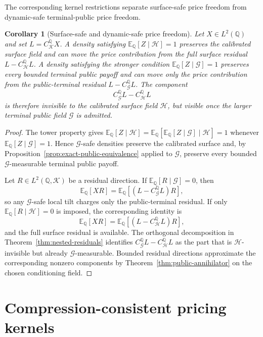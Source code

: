 \documentclass[11pt,a4paper]{amsart}
\theoremstyle{plain}
\newtheorem{corollary}[theorem]{Corollary}
\theoremstyle{definition}
\theoremstyle{remark}
\newcommand{\QQ}{\mathbb{Q}}
\newcommand{\EE}{\mathbb{E}}
\newcommand{\cG}{\mathcal{G}}
\newcommand{\cH}{\mathcal{H}}
\newcommand{\cK}{\mathcal{K}}
\begin{document}
The corresponding kernel restrictions separate surface-safe price freedom from dynamic-safe
terminal-public price freedom.

\begin{corollary}[Surface-safe and dynamic-safe price freedom]\label{cor:surface-dynamic-safe}
Let \(X\in L^2(\QQ)\) and set \(L=C_{\cK}^{\QQ}X\).  A density satisfying
\(\EE_\QQ[Z\mid\cH]=1\) preserves the calibrated surface field and can move the price contribution
from the full surface residual \(L-C_{\cH}^{\QQ}L\).  A density satisfying the stronger condition
\(\EE_\QQ[Z\mid\cG]=1\) preserves every bounded terminal public payoff and can move only the price
contribution from the public-terminal residual \(L-C_{\cG}^{\QQ}L\).  The component
\[
        C_{\cG}^{\QQ}L-C_{\cH}^{\QQ}L
\]
is therefore invisible to the calibrated surface field \(\cH\), but visible once the larger
terminal public field \(\cG\) is admitted.
\end{corollary}

\begin{proof}
The tower property gives
\(\EE_\QQ[Z\mid\cH]=\EE_\QQ[\EE_\QQ[Z\mid\cG]\mid\cH]=1\) whenever
\(\EE_\QQ[Z\mid\cG]=1\).  Hence \(\cG\)-safe densities preserve the calibrated surface and, by
Proposition~\ref{prop:exact-public-equivalence} applied to \(\cG\), preserve every bounded
\(\cG\)-measurable terminal public payoff.

Let \(R\in L^2(\QQ,\cK)\) be a residual direction.  If \(\EE_\QQ[R\mid\cG]=0\), then
\[
        \EE_\QQ[XR]
        =
        \EE_\QQ[(L-C_{\cG}^{\QQ}L)R],
\]
so any \(\cG\)-safe local tilt charges only the public-terminal residual.  If only
\(\EE_\QQ[R\mid\cH]=0\) is imposed, the corresponding identity is
\[
        \EE_\QQ[XR]
        =
        \EE_\QQ[(L-C_{\cH}^{\QQ}L)R],
\]
and the full surface residual is available.  The orthogonal decomposition in
Theorem~\ref{thm:nested-residuals} identifies
\(C_{\cG}^{\QQ}L-C_{\cH}^{\QQ}L\) as the part that is \(\cH\)-invisible but already
\(\cG\)-measurable.  Bounded residual directions approximate the corresponding nonzero components
by Theorem~\ref{thm:public-annihilator} on the chosen conditioning field.
\end{proof}

\section{Compression-consistent pricing kernels}\label{sec:pricing-kernels}
\end{document}
